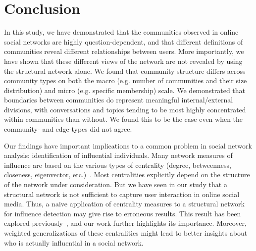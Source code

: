 \documentclass[letterpaper]{article}
\begin{document}
\section{Conclusion}


In this study, we have demonstrated that the communities observed in online social networks are highly question-dependent, and that different definitions of communities reveal different relationships between users. More importantly, we have shown that these different views of the network are not revealed by using the structural network alone. We found that community structure differs across community types on both the macro (e.g. number of communities and their size distribution) and micro (e.g. specific membership) scale. We demonstrated that boundaries between communities do represent meaningful internal/external divisions, with conversations and topics tending to be most highly concentrated within communities than without. We found this to be the case even when the community- and edge-types did not agree.







Our findings have important implications to a common problem in social network analysis: identification of influential individuals. Many network measures of influence are based on the various types of centrality (degree, betweenness, closeness, eigenvector, etc.)~\cite{newman2009networks}. Most centralities explicitly depend on the structure of the network under consideration. But we have seen in our study that a structural network is not sufficient to capture user interaction in online social media. Thus, a naive application of centrality measures to a structural network for influence detection may give rise to erroneous results. This result has been explored previously~\cite{kitsak2010identification}, and our work further highlights its importance. Moreover, weighted generalizations of these centralities might lead to better insights about who is actually influential in a social network.
\end{document}

